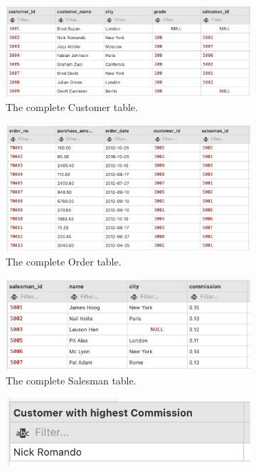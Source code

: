 \captionsetup{justification=centering}
\begin{figure}[H]
    \begin{subfigure}{1\textwidth}
        \centering
        \includegraphics[width=.6\linewidth]{images/output/cust.png}
        \caption*{The complete Customer table.}
        \label{fig:cust}
    \end{subfigure}
    \begin{subfigure}{1\textwidth}
        \centering
        \includegraphics[width=.6\linewidth]{images/output/order.png}
        \caption*{The complete Order table.}
        \label{fig:ord}
    \end{subfigure}
    \vspace*{10mm}
    \begin{subfigure}{1\textwidth}
        \centering
        \includegraphics[width=.6\linewidth]{images/output/sman.png}
        \caption*{The complete Salesman table.}
        \label{fig:sman}
    \end{subfigure}
    \vspace*{10mm}
    \begin{subfigure}{.5\textwidth}
        \centering
        \includegraphics[width=.8\linewidth]{images/output/q1.png}

\end{subfigure}
\end{figure}
